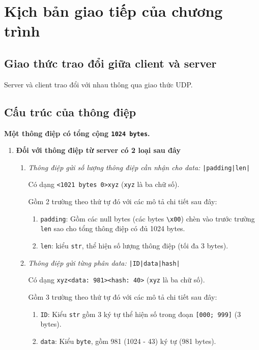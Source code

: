 \section{Kịch bản giao tiếp của chương trình}
\subsection{Giao thức trao đổi giữa client và server}
Server và client trao đổi với nhau thông qua giao thức UDP.
\subsection{Cấu trúc của thông điệp}

\large\textbf{Một thông điệp có tổng cộng \texttt{1024 bytes}.} 
\begin{enumerate}
\item \textbf{Đối với thông điệp từ server có 2 loại sau đây}
\normalsize
\begin{enumerate}
\item \textit{Thông điệp gửi số lượng thông điệp cần nhận cho data:} \texttt{|padding|len|}

Có dạng \texttt{<1021 bytes 0>xyz} (\texttt{xyz} là ba chữ số).

Gồm 2 trường theo thứ tự đó với các mô tả chi tiết sau đây:

\begin{enumerate}
\item \texttt{padding}: Gồm các null bytes (các bytes \texttt{\textbackslash x00}) chèn vào trước trường \texttt{len} sao cho tổng thông điệp có đủ 1024 bytes.

\item \texttt{len}: kiểu \texttt{str}, thể hiện số lượng thông điệp (tối đa 3 bytes).
\end{enumerate}

\item \textit{Thông điệp gửi từng phân data:} \texttt{|ID|data|hash|}

Có dạng \texttt{xyz<data: 981><hash: 40>} (\texttt{xyz} là ba chữ số).

Gồm 3 trường theo thứ tự đó với các mô tả chi tiết sau đây:

\begin{enumerate}
\item \texttt{ID}: Kiểu \texttt{str} gồm 3 ký tự thể hiện số trong đoạn \texttt{[000; 999]} (3 bytes).

\item \texttt{data}: Kiểu \texttt{byte}, gồm 981 (1024 - 43) ký tự (981 bytes).


\end{enumerate}
\end{enumerate}
\end{enumerate}

